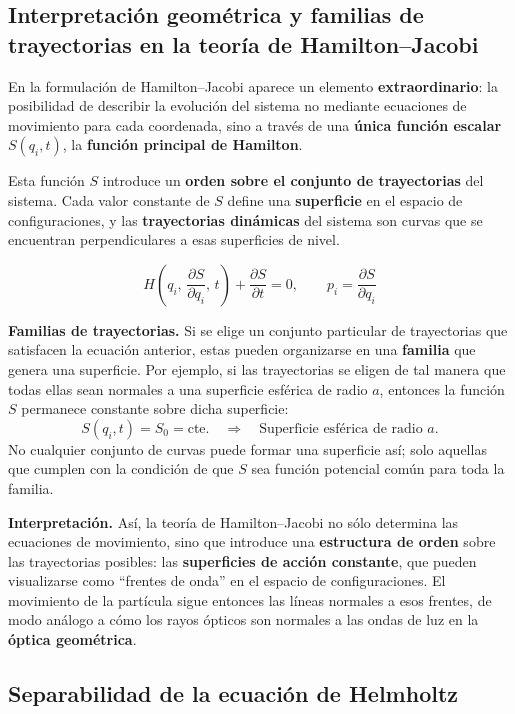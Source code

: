 \documentclass{article}
\begin{document}
\subsection{Interpretación geométrica y familias de trayectorias en la teoría de Hamilton--Jacobi}

En la formulación de Hamilton--Jacobi aparece un elemento \textbf{extraordinario}: 
la posibilidad de describir la evolución del sistema no mediante ecuaciones de movimiento 
para cada coordenada, sino a través de una \textbf{única función escalar} \(S(q_i,t)\),
la \textbf{función principal de Hamilton}.  

Esta función \(S\) introduce un \textbf{orden sobre el conjunto de trayectorias} del sistema.  
Cada valor constante de \(S\) define una \textbf{superficie} en el espacio de configuraciones, 
y las \textbf{trayectorias dinámicas} del sistema son curvas que se encuentran 
perpendiculares a esas superficies de nivel.

\[
H\!\left(q_i,\,\frac{\partial S}{\partial q_i},\,t\right)
+ \frac{\partial S}{\partial t} = 0,
\qquad
p_i = \frac{\partial S}{\partial q_i}
\]

\textbf{Familias de trayectorias.}  
Si se elige un conjunto particular de trayectorias que satisfacen la ecuación anterior, 
estas pueden organizarse en una \textbf{familia} que genera una superficie.  
Por ejemplo, si las trayectorias se eligen de tal manera que todas ellas 
sean normales a una superficie esférica de radio \(a\), 
entonces la función \(S\) permanece constante sobre dicha superficie:
\[
S(q_i,t) = S_0 = \text{cte.} \quad \Rightarrow \quad
\text{Superficie esférica de radio } a.
\]
No cualquier conjunto de curvas puede formar una superficie así; 
solo aquellas que cumplen con la condición de que \(S\) sea función potencial común 
para toda la familia.

\textbf{Interpretación.}  
Así, la teoría de Hamilton--Jacobi no sólo determina las ecuaciones de movimiento, 
sino que introduce una \textbf{estructura de orden} sobre las trayectorias posibles: 
las \textbf{superficies de acción constante}, que pueden visualizarse como “frentes de onda” 
en el espacio de configuraciones.  
El movimiento de la partícula sigue entonces las líneas normales a esos frentes,
de modo análogo a cómo los rayos ópticos son normales a las ondas de luz 
en la \textbf{óptica geométrica}.

\subsection{Separabilidad de la ecuación de Helmholtz}
\end{document}
